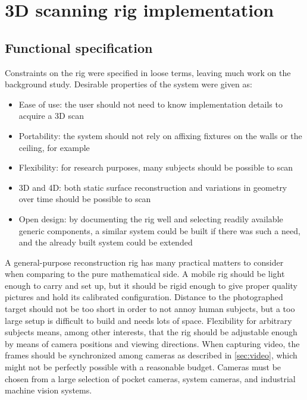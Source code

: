 \section{3D scanning rig implementation} \label{sec:implementation}

\subsection{Functional specification} %

Constraints on the rig were specified in loose terms, leaving much work on the background study.
Desirable properties of the system were given as:

\begin{itemize}
	\item Ease of use: the user should not need to know implementation details to acquire a 3D scan
	\item Portability: the system should not rely on affixing fixtures on the walls or the ceiling, for example
	\item Flexibility: for research purposes, many subjects should be possible to scan
	\item 3D and 4D: both static surface reconstruction and variations in geometry over time should be possible to scan
	\item Open design: by documenting the rig well and selecting readily available generic components, a similar system could be built if there was such a need, and the already built system could be extended
\end{itemize}


A general-purpose reconstruction rig has many practical matters to consider when comparing to the pure mathematical side.
A mobile rig should be light enough to carry and set up, but it should be rigid enough to give proper quality pictures and hold its calibrated configuration.
Distance to the photographed target should not be too short in order to not annoy human subjects, but a too large setup is difficult to build and needs lots of space.
Flexibility for arbitrary subjects means, among other interests, that the rig should be adjustable enough by means of camera positions and viewing directions.
When capturing video, the frames should be synchronized among cameras as described in \ref{sec:video}, which might not be perfectly possible with a reasonable budget.
Cameras must be chosen from a large selection of pocket cameras, system cameras, and industrial machine vision systems.

